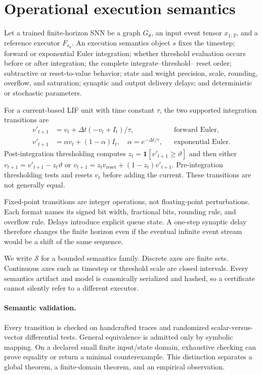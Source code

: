 \section{Operational execution semantics}

Let a trained finite-horizon SNN be a graph $G_\theta$, an input event tensor
$x_{1:T}$, and a reference executor $F_{s_0}$. An execution semantics object $s$
fixes the timestep; forward or exponential Euler integration; whether threshold
evaluation occurs before or after integration; the complete integrate--threshold--
reset order; subtractive or reset-to-value behavior; state and weight precision,
scale, rounding, overflow, and saturation; synaptic and output delivery delays;
and deterministic or stochastic parameters.

For a current-based LIF unit with time constant $\tau$, the two supported
integration transitions are
\begin{align}
v'_{t+1} &= v_t + \Delta t(-v_t + I_t)/\tau,
    &&\text{forward Euler},\\
v'_{t+1} &= \alpha v_t + (1-\alpha)I_t,\quad
\alpha=e^{-\Delta t/\tau},
    &&\text{exponential Euler}.
\end{align}
Post-integration thresholding computes $z_t=\mathbf{1}[v'_{t+1}\geq\vartheta]$
and then either $v_{t+1}=v'_{t+1}-z_t\vartheta$ or
$v_{t+1}=z_t v_{\mathrm{reset}}+(1-z_t)v'_{t+1}$. Pre-integration thresholding
tests and resets $v_t$ before adding the current. These transitions are not
generally equal.

Fixed-point transitions are integer operations, not floating-point perturbations.
Each format names its signed bit width, fractional bits, rounding rule, and
overflow rule. Delays introduce explicit queue state. A one-step synaptic delay
therefore changes the finite horizon even if the eventual infinite event stream
would be a shift of the same sequence.

We write $\mathcal{S}$ for a bounded semantics family. Discrete axes are finite
sets. Continuous axes such as timestep or threshold scale are closed intervals.
Every semantics artifact and model is canonically serialized and hashed, so a
certificate cannot silently refer to a different executor.

\paragraph{Semantic validation.}
Every transition is checked on handcrafted traces and randomized scalar-versus-
vector differential tests. General equivalence is admitted only by symbolic
mapping. On a declared small finite input/state domain, exhaustive checking can
prove equality or return a minimal counterexample. This distinction separates a
global theorem, a finite-domain theorem, and an empirical observation.

